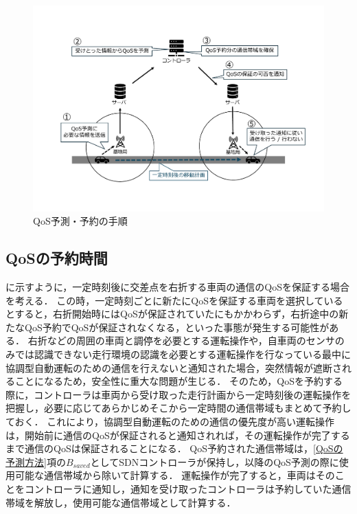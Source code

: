 \documentclass[a4paper,11pt,uplatex]{ujreport}
\begin{document}
  \begin{figure}[tb]
    \centering
    \includegraphics[width=\linewidth]{img/QoS予測・予約の手順.pdf}
    \caption{QoS予測・予約の手順}
    \label{fig:QoSReservation}
  \end{figure}

\subsection{QoSの予約時間}

に示すように，一定時刻後に交差点を右折する車両の通信のQoSを保証する場合を考える．
この時，一定時刻ごとに新たにQoSを保証する車両を選択しているとすると，右折開始時にはQoSが保証されていたにもかかわらず，右折途中の新たなQoS予約でQoSが保証されなくなる，といった事態が発生する可能性がある．
右折などの周囲の車両と調停を必要とする運転操作や，自車両のセンサのみでは認識できない走行環境の認識を必要とする運転操作を行なっている最中に協調型自動運転のための通信を行えないと通知された場合，突然情報が遮断されることになるため，安全性に重大な問題が生じる．
そのため，QoSを予約する際に，コントローラは車両から受け取った走行計画から一定時刻後の運転操作を把握し，必要に応じてあらかじめそこから一定時間の通信帯域もまとめて予約しておく．
これにより，協調型自動運転のための通信の優先度が高い運転操作は，開始前に通信のQoSが保証されると通知されれば，その運転操作が完了するまで通信のQoSは保証されることになる．
QoS予約された通信帯域は，\ref{QoSの予測方法}項の$B_{saved}$としてSDNコントローラが保持し，以降のQoS予測の際に使用可能な通信帯域から除いて計算する．
運転操作が完了すると，車両はそのことをコントローラに通知し，通知を受け取ったコントローラは予約していた通信帯域を解放し，使用可能な通信帯域として計算する．
\end{document}

